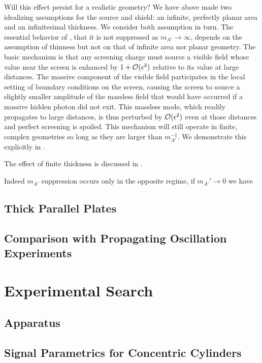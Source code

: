 \documentclass[prd,longbibliography,nofootinbib]{revtex4-2}
\newcommand{\mA}{m_{A'}}
\begin{document}
Will this effect persist for a realistic geometry? 
We have above made two idealizing assumptions for the source and shield: an infinite, perfectly planar area and an infinitesimal thickness. 
We consider both assumption in turn.
The essential behavior of , that it is not suppressed as $\mA \rightarrow \infty$, depends on the assumption of thinness but not on that of infinite area nor planar geometry. 
The basic mechanism is that any screening charge must source a visible field whose value near the screen is enhanced by $ 1 + \mathcal{O}(\epsilon^2)$ relative to its value at large distances. 
The massive component of the visible field participates in the local setting of boundary conditions on the screen, causing the screen to source a slightly smaller amplitude of the massless field that would have occurred if a massive hidden photon did not exit. 
This massless mode, which readily propagates to large distances, is thus perturbed by $\mathcal{O}(\epsilon^2)$ even at those distances and perfect screening is spoiled. 
This mechanism will still operate in finite, complex geometries so long as they are larger than $\mA^{-1}$. 
We demonstrate this explicitly in .  

The effect of finite thickness is discussed in .

Indeed $\mA$ suppression occurs only in the opposite regime, if $\mA' \rightarrow 0$ we have 
\eqa{
    \vec{E}_{V} \approx E_0 \epsilon^2 \mA^2 a z. 
}

\subsection{Thick Parallel Plates}
\label{sec:thick-plate}


\subsection{Comparison with Propagating Oscillation Experiments}

\section{Experimental Search}

\subsection{Apparatus}

\subsection{Signal Parametrics for Concentric Cylinders}
\end{document}
